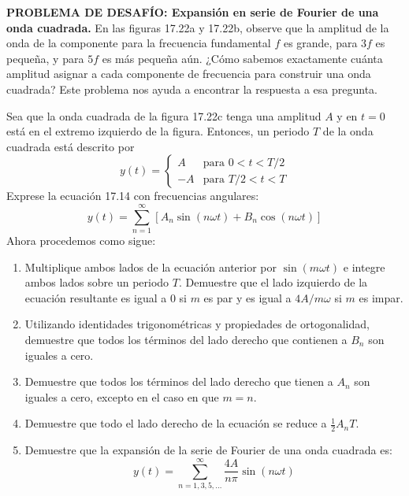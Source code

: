 \item \textbf{PROBLEMA DE DESAFÍO: Expansión en serie de Fourier de una onda cuadrada.}
En las figuras 17.22a y 17.22b, observe que la amplitud de la onda de la componente para la frecuencia fundamental $f$ es grande, para $3f$ es pequeña, y para $5f$ es más pequeña aún. ¿Cómo sabemos exactamente cuánta amplitud asignar a cada componente de frecuencia para construir una onda cuadrada? Este problema nos ayuda a encontrar la respuesta a esa pregunta.

Sea que la onda cuadrada de la figura 17.22c tenga una amplitud $A$ y en $t = 0$ está en el extremo izquierdo de la figura. Entonces, un periodo $T$ de la onda cuadrada está descrito por
$$ y(t) = \begin{cases} A & \text{para } 0 < t < T/2 \\ -A & \text{para } T/2 < t < T \end{cases} $$
Exprese la ecuación 17.14 con frecuencias angulares:
$$ y(t) = \sum_{n=1}^\infty \left[ A_n \sin(n\omega t) + B_n \cos(n\omega t) \right] $$
Ahora procedemos como sigue:
\begin{enumerate}
    \item Multiplique ambos lados de la ecuación anterior por $\sin(m\omega t)$ e integre ambos lados sobre un periodo $T$. Demuestre que el lado izquierdo de la ecuación resultante es igual a 0 si $m$ es par y es igual a $4A/m\omega$ si $m$ es impar.
    \item Utilizando identidades trigonométricas y propiedades de ortogonalidad, demuestre que todos los términos del lado derecho que contienen a $B_n$ son iguales a cero.
    \item Demuestre que todos los términos del lado derecho que tienen a $A_n$ son iguales a cero, excepto en el caso en que $m = n$.
    \item Demuestre que todo el lado derecho de la ecuación se reduce a $\frac{1}{2} A_n T$.
    \item Demuestre que la expansión de la serie de Fourier de una onda cuadrada es:
    $$ y(t) = \sum_{n=1, 3, 5, \dots}^\infty \frac{4A}{n\pi} \sin(n\omega t) $$
\end{enumerate}